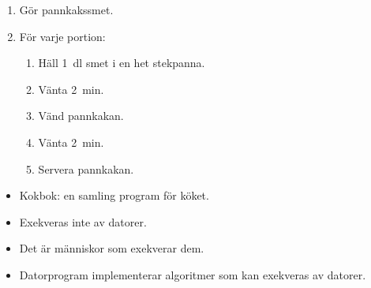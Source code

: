 \begin{frame}
  \begin{example}
    \begin{enumerate}
      \item Gör pannkakssmet.
      \item För varje portion:
        \begin{enumerate}
          \item Häll \SI{1}{\deci\litre} smet i en het stekpanna.
          \item Vänta \SI{2}{\minute}.
          \item Vänd pannkakan.
          \item Vänta \SI{2}{\minute}.
          \item Servera pannkakan.
        \end{enumerate}
    \end{enumerate}
  \end{example}
\end{frame}


\begin{frame}
  \begin{remark}
    \begin{itemize}
      \item Kokbok: en samling program för köket.
      \item Exekveras inte av datorer.
      \item Det är människor som exekverar dem.
    \end{itemize}
  \end{remark}

  \pause

  \begin{remark}
    \begin{itemize}
      \item Datorprogram implementerar algoritmer som kan exekveras av datorer.
    \end{itemize}
  \end{remark}
\end{frame}


